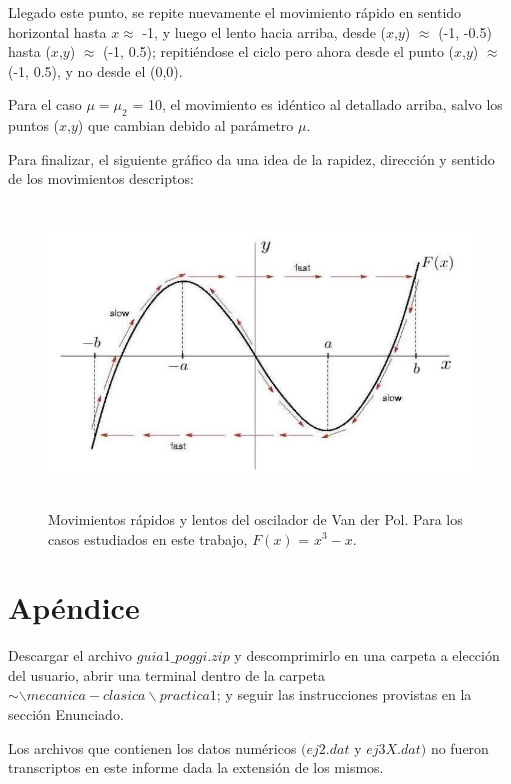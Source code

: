 \documentclass[a4paper,12pt]{article}
\begin{document}
\begin{itemize}
Llegado este punto, se repite nuevamente el movimiento r\'apido en sentido horizontal hasta $x \approx$ -1, y luego el lento hacia arriba, desde ($x$,$y$) $\approx$ (-1, -0.5) hasta ($x$,$y$) $\approx$ (-1, 0.5); repiti\'endose el ciclo pero ahora desde el punto ($x$,$y$) $\approx$ (-1, 0.5), y no desde el (0,0).

Para el caso $\mu = \mu_2$ = 10, el movimiento es id\'entico al detallado arriba, salvo los puntos ($x$,$y$) que cambian debido al par\'ametro $\mu$.

Para finalizar, el siguiente gr\'afico da una idea de la rapidez, direcci\'on y sentido de los movimientos descriptos:


\begin{figure}[H]
\begin{center}
\includegraphics[height=8cm]{grafico_movimientos.jpg}
\caption[width=5cm]{Movimientos r\'apidos y lentos del oscilador de Van der Pol. Para los casos estudiados en este trabajo, $F(x)$ = $x^3 - x$.}
\end{center}
\end{figure}


\end{itemize}

\section{Ap\'endice}

Descargar el archivo $guia1\_poggi.zip$ y descomprimirlo en una carpeta a elecci\'on del usuario, abrir una terminal dentro de la carpeta $\sim \backslash mecanica-clasica\backslash practica1$; y seguir las instrucciones provistas en la secci\'on Enunciado.

Los archivos que contienen los datos num\'ericos $(ej2.dat$ y $ej3X.dat)$ no fueron transcriptos en este informe dada la extensi\'on de los mismos.
\end{document}
